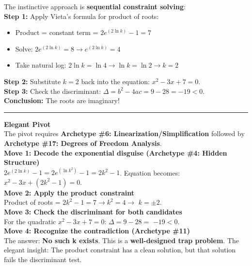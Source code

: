 \documentclass{article}
\begin{document}
\noindent The instinctive approach is \textbf{sequential constraint solving}: \\

\noindent \textbf{Step 1:} Apply Vieta's formula for product of roots:
\begin{itemize}
    \item Product = constant term = $2e^{(2\ln k)} - 1 = 7$
    \item Solve: $2e^{(2\ln k)} = 8 \to e^{(2\ln k)} = 4$
    \item Take natural log: $2\ln k = \ln 4 \to \ln k = \ln 2 \to k = 2$
\end{itemize}

\noindent \textbf{Step 2:} Substitute $k = 2$ back into the equation: $x^2 - 3x + 7 = 0$. \\

\noindent \textbf{Step 3:} Check the discriminant: $\Delta = b^2 - 4ac = 9 - 28 = -19 < 0$. \\

\noindent \textbf{Conclusion:} The roots are imaginary! \\

\noindent \rule{\textwidth}{0.4pt}

\noindent \textbf{Elegant Pivot} \\

\noindent The pivot requires \textbf{Archetype \#6: Linearization/Simplification} followed by \textbf{Archetype \#17: Degrees of Freedom Analysis}. \\

\noindent \textbf{Move 1: Decode the exponential disguise (Archetype \#4: Hidden Structure)} \\
$2e^{(2\ln k)} - 1 = 2e^{(\ln k^2)} - 1 = 2k^2 - 1$. Equation becomes: \textbf{$x^2 - 3x + (2k^2 - 1) = 0$}. \\

\noindent \textbf{Move 2: Apply the product constraint} \\
Product of roots = $2k^2 - 1 = 7 \to k^2 = 4 \to$ \textbf{$k = \pm 2$}. \\

\noindent \textbf{Move 3: Check the discriminant for both candidates} \\
For the quadratic $x^2 - 3x + 7 = 0$: $\Delta = 9 - 28 = $ \textbf{$-19 < 0$}. \\

\noindent \textbf{Move 4: Recognize the contradiction (Archetype \#11)} \\
The answer: \textbf{No such k exists}. This is a \textbf{well-designed trap problem}. The elegant insight: The product constraint has a clean solution, but that solution fails the discriminant test. \\
\end{document}
